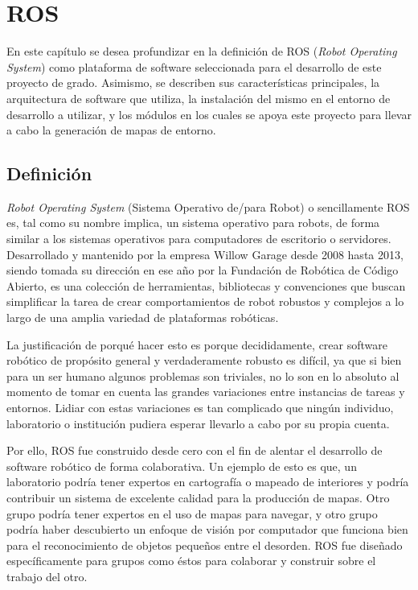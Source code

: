 \chapter{ROS}

En este capítulo se desea profundizar en la definición de ROS (\textit{Robot Operating System}) como plataforma de software seleccionada para el desarrollo de este proyecto de grado. Asimismo, se describen sus características principales, la arquitectura de software que utiliza, la instalación del mismo en el entorno de desarrollo a utilizar, y los módulos en los cuales se apoya este proyecto para llevar a cabo la generación de mapas de entorno.

\section{Definición}

\textit{Robot Operating System} (Sistema Operativo de/para Robot) o sencillamente ROS es, tal como su nombre implica, un sistema operativo para robots, de forma similar a los sistemas operativos para computadores de escritorio o servidores. Desarrollado y mantenido por la empresa Willow Garage desde 2008 hasta 2013, siendo tomada su dirección en ese año por la Fundación de Robótica de Código Abierto, es una colección de herramientas, bibliotecas y convenciones que buscan simplificar la tarea de crear comportamientos de robot robustos y complejos a lo largo de una amplia variedad de plataformas robóticas.

La justificación de porqué hacer esto es porque decididamente, crear software robótico de propósito general y verdaderamente robusto es difícil, ya que si bien para un ser humano algunos problemas son triviales, no lo son en lo absoluto al momento de tomar en cuenta las grandes variaciones entre instancias de tareas y entornos. Lidiar con estas variaciones es tan complicado que ningún individuo, laboratorio o institución pudiera esperar llevarlo a cabo por su propia cuenta.

Por ello, ROS fue construido desde cero con el fin de alentar el desarrollo de software robótico de forma colaborativa. Un ejemplo de esto es que, un laboratorio podría tener expertos en cartografía o mapeado de interiores y podría contribuir un sistema de excelente calidad para la producción de mapas. Otro grupo podría tener expertos en el uso de mapas para navegar, y otro grupo podría haber descubierto un enfoque de visión por computador que funciona bien para el reconocimiento de objetos pequeños entre el desorden. ROS fue diseñado específicamente para grupos como éstos para colaborar y construir sobre el trabajo del otro. \cite{aboutros}

